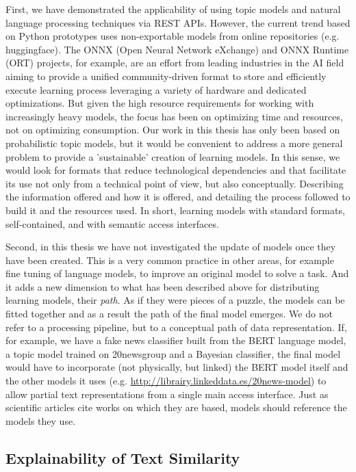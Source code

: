 First, we have demonstrated the applicability of using topic models and natural language processing techniques via REST APIs. However, the current trend based on Python prototypes uses non-exportable models from online repositories (e.g. huggingface). The ONNX (Open Neural Network eXchange) and ONNX Runtime (ORT) projects, for example, are an effort from leading industries in the AI field aiming to provide a unified community-driven format to store and efficiently execute learning process leveraging a variety of hardware and dedicated optimizations. But given the high resource requirements for working with increasingly heavy models, the focus has been on optimizing time and resources, not on optimizing consumption. Our work in this thesis has only been based on probabilistic topic models, but it would be convenient to address a more general problem to provide a 'sustainable' creation of learning models. In this sense, we would look for formats that reduce technological dependencies and that facilitate its use not only from a technical point of view, but also conceptually. Describing the information offered and how it is offered, and detailing the process followed to build it and the resources used. In short, learning models with standard formats, self-contained, and with semantic access interfaces.

Second, in this thesis we have not investigated the update of models once they have been created. This is a very common practice in other areas, for example fine tuning of language models, to improve an original model to solve a task. And it adds a new dimension to what has been described above for distributing learning models, their \textit{path}. As if they were pieces of a puzzle, the models can be fitted together and as a result the path of the final model emerges. We do not refer to a processing pipeline, but to a conceptual path of data representation. If, for example, we have a fake news classifier built from the BERT language model, a topic model trained on 20newsgroup and a Bayesian classifier, the final model would have to incorporate (not physically, but linked) the BERT model itself and the other models it uses (e.g. \url{http://librairy.linkeddata.es/20news-model}) to allow partial text representations from a single main access interface. Just as scientific articles cite works on which they are based, models should reference the models they use. 


\subsection{Explainability of Text Similarity}

